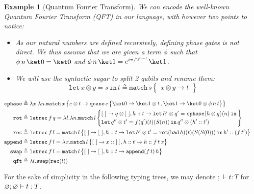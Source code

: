 \documentclass[10pt,a4paper]{article}
\newcommand{\nil}{[~]}
\newcommand{\textqcase}{\ensuremath{\mathtt{qcase}}}
\newcommand{\textmatch}{\ensuremath{\mathtt{match}}}
\newcommand{\textletrec}{\ensuremath{\mathtt{letrec}}}
\newcommand{\zket}{\ket 0}
\newcommand{\oket}{\ket 1}
\newcommand{\qcasebase}[2]{
  \textqcase\,#1\left\{\! \begin{aligned} #2 \end{aligned}\right\}
}
\newcommand{\qcase}[3]{
  \qcasebase {#1} {\zket \to #2\,, \oket \to #3}
}
\newcommand{\match}[2]{
  \textmatch\,#1\left\{\! \begin{aligned} #2 \end{aligned}\right\}
}
\newcommand{\lbd}[2]{\lambda #1 .#2}
\newcommand{\letrec}[3]{\textletrec\,#1\,#2=#3}
\newcommand{\typing}[4]{
  \ifx&#1&\varnothing \else #1\fi; 
  \ifx&#2&\varnothing \else #2\fi 
  \vdash {#3} : #4
}
\newcommand{\closedtyping}[2]{\typing{}{}{#1}{#2}}
\newtheorem{example}[theorem]{Example}
\begin{document}
\begingroup
\newcommand{\letsug}[3]{\mathtt{let}\,#1=#2\, \mathtt{in}\,#3}
\begin{example}[Quantum Fourier Transform]
  \label{ex:qft}
  We can encode the well-known Quantum Fourier Transform (QFT) in our language,
  with however two points to notice:
  \begin{itemize}
    \item As our natural numbers are defined recursively, defining
      phase gates is not direct.
      We thus assume that we are given a term $\phi$ such that
      $\phi\,n\,\zket = \zket$ and
      $\phi\,n\,\oket = e^{i\pi/2^{n-1}} \oket$.
    \item We will use the syntactic sugar to split 2 qubits and rename them:
      \[
        \letsug{x \otimes y}{s}{t} \triangleq \match s {x \otimes y
        \to t}
      \]
  \end{itemize}
  \[
    \begin{aligned}
      \mathtt{cphase} &\triangleq \lbd x \lbd n \match x {
        c \otimes t \to \qcase c {
          \oket \otimes t
        } {
          \zket \otimes \phi\,n\,t
        }
      } \\
      \mathtt{rot} &\triangleq \letrec f q \lbd l \lbd n \match l {
        &\nil \to q \otimes \nil,
        h::t \to \letsug{h' \otimes q'}{\mathtt{cphase}(h \otimes q)(n)}{
          \\
          &\letsug{q'' \otimes t'}{f(q')(t)(S(n))}{
            q'' \otimes (h'::t')
          }
        }
      } \\
      \mathtt{rec} &\triangleq \letrec f l \match l {
        \nil \to \nil, h::t \to \letsug{h' \otimes
        t'}{\mathtt{rot}(\mathtt{had}\,h)(t)(S(S(0)))}{
          h'::(f\,t')
        }
      } \\
      \mathtt{append} &\triangleq \letrec f l \lbd x \match l {
        \nil \to x :: \nil, h::t \to h::f\,t\,x
      } \\
      \mathtt{swap} &\triangleq \letrec f l \match l {
        \nil \to \nil,
        h::t \to \mathtt{append}(f\,t)\,h
      } \\
      \mathtt{qft} &\triangleq \lbd l \mathtt{swap}(\mathtt{rec}(l))
    \end{aligned}
  \]
\end{example}
\endgroup

\begingroup
\renewcommand{\closedtyping}[2]{;\vdash #1 : #2}

For the sake of simplicity in the following typing trees,
we may denote $\closedtyping t T$ for $\typing{}{} t T$.
\end{document}
